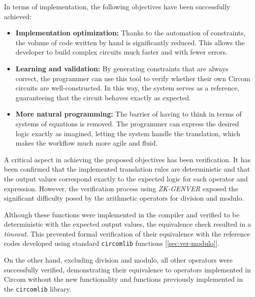 \documentclass[a4paper,12pt]{report}
\begin{document}
	\vspace{0.2cm}
	
	\noindent In terms of implementation, the following objectives have been successfully achieved:
	
	\begin{itemize}
		\item \textbf{Implementation optimization:} Thanks to the automation of constraints, the volume of code written by hand is significantly reduced. This allows the developer to build complex circuits much faster and with fewer errors.
		\item \textbf{Learning and validation:} By generating constraints that are always correct, the programmer can use this tool to verify whether their own Circom circuits are well-constructed. In this way, the system serves as a reference, guaranteeing that the circuit behaves exactly as expected.
		\item \textbf{More natural programming:} The barrier of having to think in terms of systems of equations is removed. The programmer can express the desired logic exactly as imagined, letting the system handle the translation, which makes the workflow much more agile and fluid.
	\end{itemize}
	
	\vspace{0.2cm}
	
	\noindent A critical aspect in achieving the proposed objectives has been verification. It has been confirmed that the implemented translation rules are deterministic and that the output values correspond exactly to the expected logic for each operator and expression. However, the verification process using \textit{ZK-GENVER} exposed the significant difficulty posed by the arithmetic operators for division and modulo.
	
	\vspace{0.2cm}
	\noindent Although these functions were implemented in the compiler and verified to be deterministic with the expected output values, the equivalence check resulted in a \textit{timeout}. This prevented formal verification of their equivalence with the reference codes developed using standard \texttt{circomlib} functions [\ref{sec:ver-modulo}].
	
	\vspace{0.2cm}
	\noindent On the other hand, excluding division and modulo, all other operators were successfully verified, demonstrating their equivalence to operators implemented in Circom without the new functionality and functions previously implemented in the \texttt{circomlib} library.
	
\end{document}

